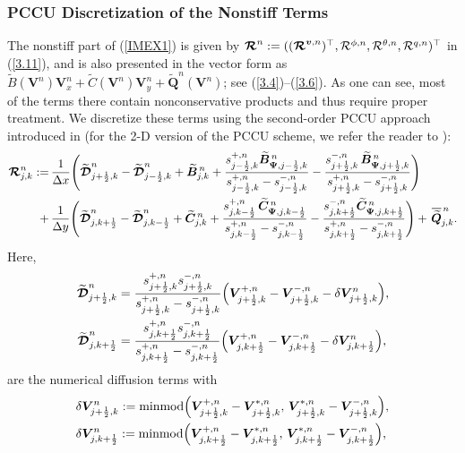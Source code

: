 \documentclass[a4paper,11pt,twoside]{article}
\numberwithin{equation}{section}
\numberwithin{figure}{section}
\numberwithin{table}{section}
\newcommand{\jL}{j-\frac{1}{2}}
\newcommand{\jR}{j+\frac{1}{2}}
\newcommand{\kL}{k-\frac{1}{2}}
\newcommand{\kR}{k+\frac{1}{2}}
\newcommand{\dx}{\Delta x}
\newcommand{\dy}{\Delta y}
\newcommand{\bv}{\bm{v}}
\newcommand{\bV}{\bm{V}}
\newcommand{\bQ}{\bm{Q}}
\newcommand\eref[1]{(\ref{#1})}
\newcommand*\xbar[1]{%
	\hbox{%
		\vbox{%
			\hrule height 0.5pt %
			\kern0.3ex%
			\hbox{%
				\kern-0.05em%
				\ensuremath{#1}%
				\kern-0.02em%
			}%
		}%
	}%
}
\begin{document}
\subsubsection{PCCU Discretization of the Nonstiff Terms}
The nonstiff part of \eref{IMEX1} is given by
$\bm{{\cal R}}^n:=((\bm{{\cal R}}^{\bv,n})^\top,{\cal R}^{\phi,n},{\cal R}^{\theta,n},{\cal R}^{q,n})^\top$ in \eref{3.11}, and is also
presented in the vector form as $\widetilde B(\bV^n)\bV_x^n+\widetilde C(\bV^n)\bV_y^n+\widetilde{\bQ}^n(\bV^n)$; see
\eref{3.4}--\eref{3.6}. As one can see, most of the terms there contain nonconservative products and thus require proper treatment. We
discretize these terms using the second-order PCCU approach introduced in \cite{Castro_2019} (for the 2-D version of the PCCU scheme, we
refer the reader to \cite{Chu_2022}):
\begin{equation}
\begin{aligned}
\bm{{\cal R}}_{j,k}^n:=\,&\frac{1}{\dx}\Bigg(\widetilde{\bm{{\cal D}}}_{\jR,k}^n-\widetilde{\bm{{\cal D}}}_{\jL,k}^n+ 
\widetilde{\bm B}_{j,k}^{\,n}+\frac{s^{+,n}_{\jL,k}\widetilde{\bm B}_{\bm\Psi,\jL,k}^{\,n}}{s^{+,n}_{\jL,k}-s^{-,n}_{\jL,k}}
-\frac{s^{-,n}_{\jR,k}\,\widetilde{\bm B}_{\bm\Psi,\jR,k}^{\,n}}{s^{+,n}_{\jR,k}-s^{-,n}_{\jR,k}}\Bigg)\\ 
+\,&\frac{1}{\dy}\Bigg(\widetilde{\bm{{\cal D}}}_{j,\kR}^n-\widetilde{\bm{{\cal D}}}_{j,\kL}^n+\widetilde{\bm C}_{j,k}^{\,n}
+\frac{s^{+,n}_{j,\kL}\,\widetilde{\bm C}_{\bm\Psi,j,\kL}^{\,n}}{s^{+,n}_{j,\kL}-s^{-,n}_{j,\kL}}-\frac{s^{-,n}_{j,\kR}
\widetilde{\bm C}_{\bm\Psi,j,\kR}^{\,n}}{s^{+,n}_{j,\kR}-s^{-,n}_{j,\kR}}\Bigg)+\,\xbar{\widetilde{\bQ}}_{j,k}^{\,n}.
\end{aligned}
\label{3.34}
\end{equation}	
Here,
\begin{equation*}
\begin{aligned}
\widetilde{\bm{{\cal D}}}_{\jR,k}^n&=\frac{s^{+,n}_{\jR,k}s^{-,n}_{\jR,k}}{s^{+,n}_{\jR,k}-s^{-,n}_{\jR,k}}
\Big(\bV^{+,n}_{\jR,k}-\bV^{-,n}_{\jR,k}-\delta\bV_{\jR,k}^n\Big),\\
\widetilde{\bm{{\cal D}}}_{j,\kR}^n&=\frac{s^{+,n}_{j,\kR}s^{-,n}_{j,\kR}}{s^{+,n}_{j,\kR}-s^{-,n}_{j,\kR}}
\Big(\bV^{+,n}_{j,\kR}-\bV^{-,n}_{j,\kR}-\delta\bV_{j,\kR}^n\Big),
\end{aligned}
\end{equation*}
are the numerical diffusion terms with
\begin{equation*}
\begin{aligned}
&\delta\bV_{\jR,k}^n:={\rm minmod}\Big(\bV^{+,n}_{\jR,k}-\bV^{*,n}_{\jR,k},\,\bV^{*,n}_{\jR,k}-\bV^{-,n}_{\jR,k}\Big),\\
&\delta\bV_{j,\kR}^n:={\rm minmod}\Big(\bV^{+,n}_{j,\kR}-\bV^{*,n}_{j,\kR},\,\bV^{*,n}_{j,\kR}-\bV^{-,n}_{j,\kR}\Big),
\end{aligned}
\end{equation*}
\end{document}
